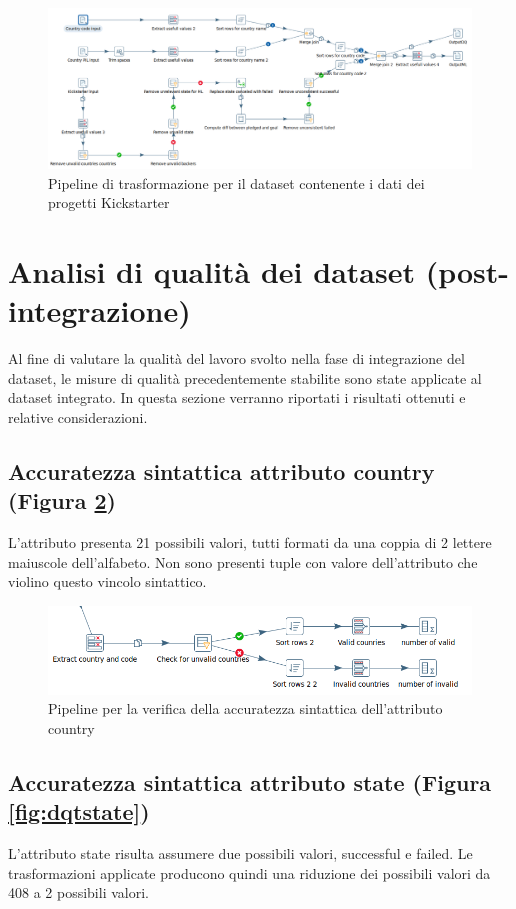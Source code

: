 \begin{figure}[p!]
	\centering
	\includegraphics[angle=90,origin=c,width=0.55\linewidth]{images/transformation_complete}
	\caption{Pipeline di trasformazione per il dataset contenente i dati dei progetti Kickstarter}
	\label{fig:transformationcomplete}
\end{figure}

\newpage
\section{Analisi di qualità dei dataset (post-integrazione)}
Al fine di valutare la qualità del lavoro svolto nella fase di integrazione del dataset, le misure di qualità precedentemente stabilite sono state applicate al dataset integrato. In questa sezione verranno riportati i risultati ottenuti e relative considerazioni.

\subsection{Accuratezza sintattica attributo country (Figura \ref{fig:dqtcountries})}
L'attributo presenta 21 possibili valori, tutti formati da una coppia di 2 lettere maiuscole dell'alfabeto. Non sono presenti tuple con valore dell'attributo che violino questo vincolo sintattico.

\begin{figure}[h!]
	\centering
	\includegraphics[width=1\linewidth]{images/DQT_countries}
	\caption{Pipeline per la verifica della accuratezza sintattica dell'attributo country}
	\label{fig:dqtcountries}
\end{figure}


\subsection{Accuratezza sintattica attributo state (Figura \ref{fig:dqtstate})}
L'attributo state risulta assumere due possibili valori, successful e failed. Le trasformazioni applicate producono quindi una riduzione dei possibili valori da 408 a 2 possibili valori.

